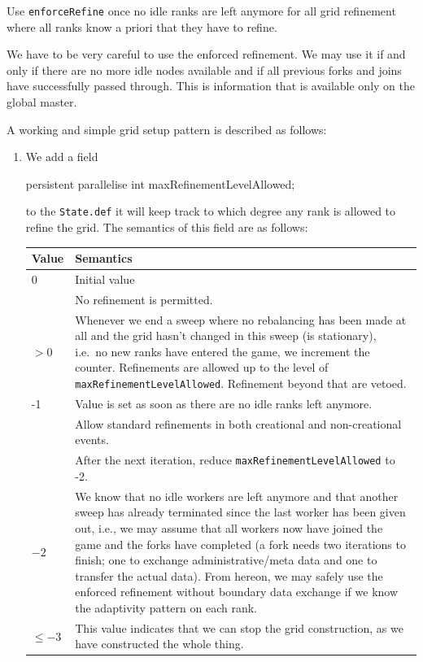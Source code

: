 \begin{solution}
Use \texttt{enforceRefine} once no idle ranks are left anymore for all grid
refinement where all ranks know a priori that they have to refine.
\end{solution}


We have to be very careful to use the enforced refinement.
We may use it if and only if there are no more idle nodes available and if all
previous forks and joins have successfully passed through. 
This is information that is available only on the global master. 

A working and simple grid setup pattern is described as follows:
\begin{enumerate}
  \item We add a field
    \begin{code}
      persistent parallelise int maxRefinementLevelAllowed;
    \end{code}
    to the \texttt{State.def} it will keep track to which degree any rank is
    allowed to refine the grid. 
    The semantics of this field are as follows:
    \begin{center}
     \begin{tabular}{lp{12cm}}
       Value & Semantics \\
       \hline
       0 & Initial value \\
         & No refinement is permitted. 
       \\
       \hline
       $>0$ & Whenever we end a sweep where no rebalancing has been made at all
       and the grid hasn't changed in this sweep (is stationary), i.e.~no new
       ranks have entered the game, we increment the counter.
       Refinements are allowed up to the level of
       \texttt{maxRefinementLevelAllowed}. Refinement beyond that are vetoed. 
       \\
       \hline
       -1 & Value is set as soon as there are no idle ranks left anymore. \\
          & Allow standard refinements in both creational and non-creational
          events. \\
          & After the next iteration, reduce \texttt{maxRefinementLevelAllowed}
          to -2.
       \\
       \hline
       $-2$ & We know that no idle workers are left anymore and that another
       sweep has already terminated since the last worker has been given out, i.e.,
       we may assume that all workers now have joined the game and the forks
       have completed (a fork needs two iterations to finish; one to exchange
       administrative/meta data and one to transfer the actual data). From
       hereon, we may safely use the enforced refinement without boundary data
       exchange if we know the adaptivity pattern on each rank.
       \\
       \hline
       $\leq -3$ & This value indicates that we can stop the grid construction,
       as we have constructed the whole thing.
     \end{tabular}
    \end{center}


\end{enumerate}
